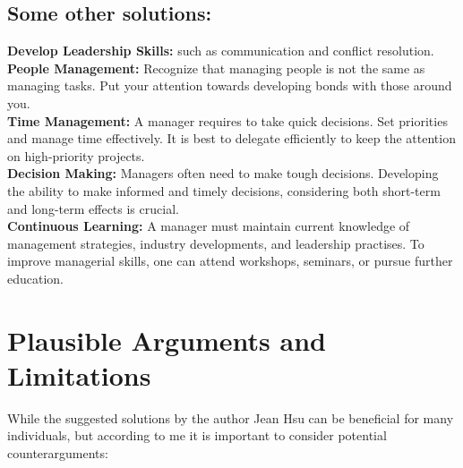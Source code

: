 \documentclass[runningheads]{article}
\begin{document}
\subsection{Some other solutions: }

\textbf{Develop Leadership Skills: } such as communication and conflict resolution. \\
\textbf{People Management: } Recognize that managing people is not the same as managing tasks. Put your attention towards developing bonds with those around you. \\
\textbf{Time Management: } A manager requires to take quick decisions. Set priorities and manage time effectively. It is best to delegate efficiently to keep the attention on high-priority projects. \\
\textbf{Decision Making: } Managers often need to make tough decisions. Developing the ability to make informed and timely decisions, considering both short-term and long-term effects is crucial. \\
\textbf{Continuous Learning: } A manager must maintain current knowledge of management strategies, industry developments, and leadership practises. To improve managerial skills, one can attend workshops, seminars, or pursue further education. \\


\section{Plausible Arguments and Limitations}

While the suggested solutions by the author Jean Hsu can be beneficial for many individuals, but according to me it is important to consider potential counterarguments:
\end{document}
